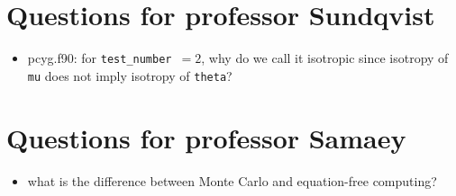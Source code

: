 \documentclass[../main/main.tex]{subfiles}
\begin{document}
\section{Questions for professor Sundqvist}
\begin{itemize}
\item pcyg.f90: for \texttt{test\_number $= 2$}, why do we call it isotropic since isotropy of \texttt{mu} does not imply isotropy of \texttt{theta}?
\end{itemize}

\newpage
\section{Questions for professor Samaey}
\begin{itemize}
\item what is the difference between Monte Carlo and equation-free computing?
\end{itemize}

\newpage
\end{document}
